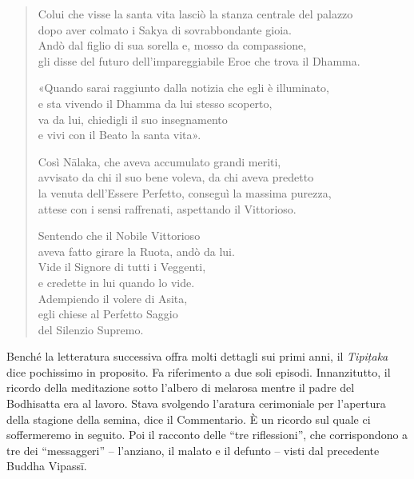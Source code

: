 \begin{quote}
Colui che visse la santa vita lasciò la stanza centrale del palazzo \\
dopo aver colmato i Sakya di sovrabbondante gioia. \\
Andò dal figlio di sua sorella e, mosso da compassione, \\
gli disse del futuro dell’impareggiabile Eroe che trova il Dhamma.

«Quando sarai raggiunto dalla notizia che egli è illuminato, \\
e sta vivendo il Dhamma da lui stesso scoperto, \\
va da lui, chiedigli il suo insegnamento \\
e vivi con il Beato la santa vita».

Così Nālaka, che aveva accumulato grandi meriti, \\
avvisato da chi il suo bene voleva, da chi aveva predetto \\
la venuta dell’Essere Perfetto, conseguì la massima purezza, \\
attese con i sensi raffrenati, aspettando il Vittorioso.

Sentendo che il Nobile Vittorioso \\
aveva fatto girare la Ruota, andò da lui. \\
Vide il Signore di tutti i Veggenti, \\
e credette in lui quando lo vide. \\
Adempiendo il volere di Asita, \\
egli chiese al Perfetto Saggio \\
del Silenzio Supremo.
\end{quote}


 Benché la letteratura successiva offra molti
dettagli sui primi anni, il \emph{Tipiṭaka} dice pochissimo in proposito. Fa
riferimento a due soli episodi. Innanzitutto, il ricordo della meditazione sotto
l’albero di melarosa mentre il padre del Bodhisatta era al lavoro. Stava
svolgendo l’aratura cerimoniale per l’apertura della stagione della semina, dice
il Commentario. È un ricordo sul quale ci soffermeremo in seguito. Poi il
racconto delle “tre riflessioni”, che corrispondono a tre dei “messaggeri” –
l’anziano, il malato e il defunto – visti dal precedente Buddha Vipassī.


